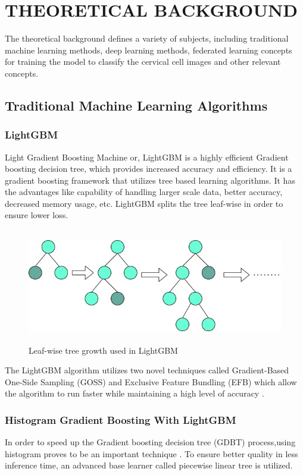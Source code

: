 \chapter{THEORETICAL BACKGROUND}
\label{chap3:background}

The theoretical background defines a variety of subjects, including traditional machine learning methods, deep learning methods, federated learning concepts for training the model to classify the cervical cell images and other relevant concepts.

\section{Traditional Machine Learning Algorithms}

\subsection{LightGBM}
Light Gradient Boosting Machine or, LightGBM is a highly efficient Gradient boosting decision tree, which provides increased accuracy and efficiency. It is a gradient boosting framework that utilizes tree based learning algorithms. It has the advantages like capability of handling larger scale data, better accuracy, decreased memory usage, etc. LightGBM splits the tree leaf-wise in order to ensure lower loss. 

\begin{figure}[H]
\centering
\includegraphics[width=150mm,height=50mm]{figures/lgbm.jpg}
\caption{Leaf-wise tree growth used in LightGBM}
\label{DLAccuracy}
\end{figure}


The LightGBM algorithm utilizes two novel techniques called Gradient-Based One-Side Sampling (GOSS) and Exclusive Feature Bundling (EFB) which allow the algorithm to run faster while maintaining a high level of accuracy \cite{ar22}.

\subsection{Histogram Gradient Boosting With LightGBM}
In order to speed up the Gradient boosting decision tree (GDBT) process,using histogram proves to be an important technique \cite{ar23}. To ensure better quality in less inference time, an advanced base learner called piecewise linear tree is utilized.

